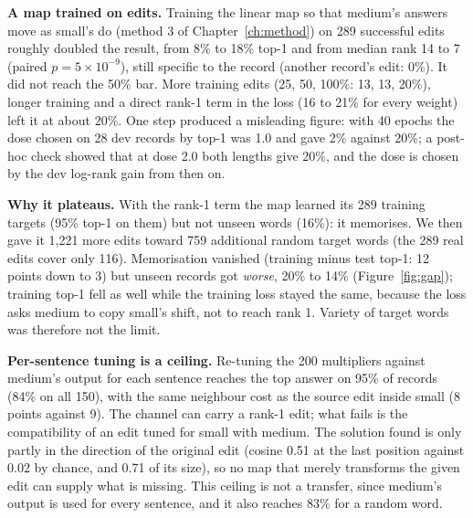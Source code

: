 \textbf{A map trained on edits.} Training the linear map so that medium's answers move as small's do (method 3 of Chapter~\ref{ch:method}) on 289 successful edits roughly doubled the result, from 8\% to 18\% top-1 and from median rank 14 to 7 (paired $p=5\times10^{-9}$), still specific to the record (another record's edit: 0\%). It did not reach the 50\% bar. More training edits (25, 50, 100\%: 13, 13, 20\%), longer training and a direct rank-1 term in the loss (16 to 21\% for every weight) left it at about 20\%. One step produced a misleading figure: with 40 epochs the dose chosen on 28 dev records by top-1 was 1.0 and gave 2\% against 20\%; a post-hoc check showed that at dose 2.0 both lengths give 20\%, and the dose is chosen by the dev log-rank gain from then on.

\textbf{Why it plateaus.} With the rank-1 term the map learned its 289 training targets (95\% top-1 on them) but not unseen words (16\%): it memorises. We then gave it 1,221 more edits toward 759 additional random target words (the 289 real edits cover only 116). Memorisation vanished (training minus test top-1: 12 points down to 3) but unseen records got \emph{worse}, 20\% to 14\% (Figure~\ref{fig:gap}); training top-1 fell as well while the training loss stayed the same, because the loss asks medium to copy small's shift, not to reach rank 1. Variety of target words was therefore not the limit.

\textbf{Per-sentence tuning is a ceiling.} Re-tuning the 200 multipliers against medium's output for each sentence reaches the top answer on 95\% of records (84\% on all 150), with the same neighbour cost as the source edit inside small (8 points against 9). The channel can carry a rank-1 edit; what fails is the compatibility of an edit tuned for small with medium. The solution found is only partly in the direction of the original edit (cosine 0.51 at the last position against 0.02 by chance, and 0.71 of its size), so no map that merely transforms the given edit can supply what is missing. This ceiling is not a transfer, since medium's output is used for every sentence, and it also reaches 83\% for a random word.

